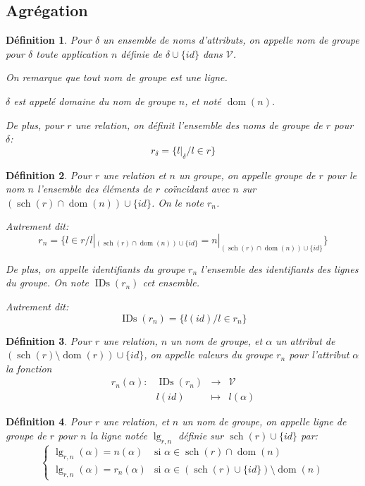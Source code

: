 \documentclass[french]{article}
\DeclareMathOperator{\dom}{dom}
\DeclareMathOperator{\s}{sch}
\DeclareMathOperator{\ids}{IDs}
\DeclareMathOperator{\lgr}{lg}
\newcommand{\val}{\mathcal{V}}
\newcommand{\cip}{\cup \{id\}}
\newtheorem{defi}{Définition}
\begin{document}
\subsection*{Agrégation}

\begin{defi}
	Pour $\delta$ un ensemble de noms d'attributs,
	on appelle \emph{nom de groupe pour $\delta$}
	toute application $n$ définie de $\delta \cup \{id\}$
	dans $\val$.
	
	On remarque que tout nom de groupe est une ligne.
	
	$\delta$ est appelé \emph{domaine} du nom de groupe $n$,
	et noté $\dom(n)$.
	
	De plus, pour $r$ une relation, on définit
	\emph{l'ensemble des noms de groupe de $r$ pour $\delta$}:
	$$
	r_\delta = \{l|_\delta / l \in r \}
	$$
\end{defi}

\begin{defi}
	Pour $r$ une relation et $n$ un groupe, on appelle
	\emph{groupe de $r$ pour le nom $n$} l'ensemble
	des éléments de $r$ coïncidant avec $n$ 
	sur $(\s(r)\cap\dom(n))\cup\{id\}$. On le note $r_n$.
	
	Autrement dit:
	$$
	r_n = \{l \in r / l|_{(\s(r)\cap\dom(n))\cup\{id\}}  = n|_{(\s(r)\cap\dom(n))\cup\{id\}} \}
	$$
	
	De plus, on appelle \emph{identifiants du groupe $r_n$} l'ensemble
	des identifiants des lignes du groupe. On note $\ids(r_n)$ cet ensemble.
	
	Autrement dit:
	$$
	\ids(r_n) = \{ l(id) / l \in r_n \}
	$$
\end{defi}

\begin{defi}
	Pour $r$ une relation, $n$ un nom de groupe,
	et $\alpha$ un attribut de
	$(\s(r) \setminus \dom(r)) \cup \{id\}$,
	on appelle \emph{valeurs du groupe $r_n$ pour
		l'attribut $\alpha$}
	la fonction
	$$
	\begin{array}{llcl}
	r_n(\alpha) : & \ids(r_n) & \rightarrow & \val \\
			& l(id) & \mapsto & l(\alpha)
	\end{array}
	$$
\end{defi}

\begin{defi}
	Pour $r$ une relation, et $n$ un nom de groupe,
	on appelle \emph{ligne de groupe de $r$ pour $n$}
	la ligne notée $\lgr_{r,n}$ définie sur $\s(r) \cip$ par:
	$$
	\left\lbrace
	\begin{array}{ll}
	\lgr_{r, n}(\alpha) = n(\alpha) & \text{si $\alpha \in \s(r) \cap \dom(n)$} \\
	\lgr_{r, n}(\alpha) = r_n(\alpha) & \text{si $\alpha \in (\s(r) \cip) \setminus \dom(n)$}
	\end{array}
	\right.
	$$ 
\end{defi}
\end{document}
